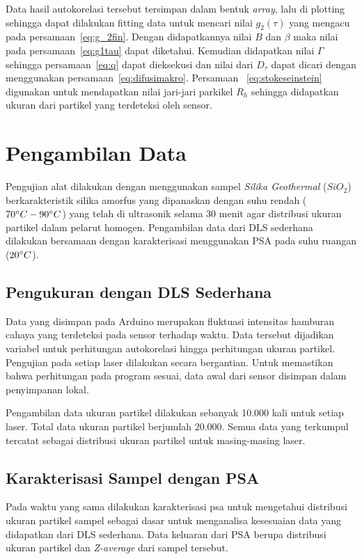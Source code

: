 Data hasil autokorelasi tersebut tersimpan dalam bentuk
\textit{array}, lalu di plotting sehingga dapat dilakukan fitting data untuk mencari nilai
${g_2 \left(\tau \right)}$ yang mengacu pada persamaan~\ref{eq:g_2fin}. Dengan didapatkannya
nilai ${B}$ dan ${\beta}$ maka nilai pada persamaan~\ref{eq:g1tau} dapat diketahui. Kemudian
didapatkan nilai ${\Gamma}$ sehingga persamaan~\ref{eq:q} dapat dieksekusi dan nilai dari
${D_{\tau}}$ dapat dicari dengan menggunakan persamaan~\ref{eq:difusimakro}. Persamaan
~\ref{eq:stokeseinstein} digunakan untuk mendapatkan nilai jari-jari parkikel ${R_h}$
sehingga didapatkan ukuran dari partikel yang terdeteksi oleh sensor.


\section{Pengambilan Data}
Pengujian alat dilakukan dengan menggunakan sampel \textit{Silika Geothermal} (${SiO_2}$)
\cite{MadeJoni2020} berkarakteristik silika amorfus yang dipanaskan dengan suhu rendah
(${70\degree C - 90\degree C}$) yang
telah di ultrasonik selama 30 menit agar distribusi ukuran partikel dalam pelarut homogen.
Pengambilan data dari DLS sederhana dilakukan bersamaan dengan karakterisasi menggunakan PSA
pada suhu ruangan (${20\degree C}$).

\subsection{Pengukuran dengan DLS Sederhana}
Data yang disimpan pada Arduino merupakan fluktuasi intensitas hamburan cahaya yang terdeteksi
pada sensor terhadap waktu. Data tersebut dijadikan variabel untuk perhitungan autokorelasi
hingga perhitungan ukuran partikel. Pengujian pada setiap laser dilakukan secara bergantian.
Untuk memastikan bahwa perhitungan pada program sesuai, data awal dari sensor disimpan dalam
penyimpanan lokal.

Pengambilan data ukuran partikel dilakukan sebanyak 10.000 kali untuk setiap laser. Total data
ukuran partikel berjumlah 20.000. Semua data yang terkumpul tercatat sebagai distribusi
ukuran partikel untuk masing-masing laser.

\subsection{Karakterisasi Sampel dengan PSA}
Pada waktu yang sama dilakukan karakterisasi psa untuk mengetahui distribusi ukuran partikel
sampel sebagai dasar untuk menganalisa kesesuaian data yang didapatkan dari DLS sederhana.
Data keluaran dari PSA berupa distribusi ukuran partikel dan \textit{Z-average} dari sampel
tersebut.